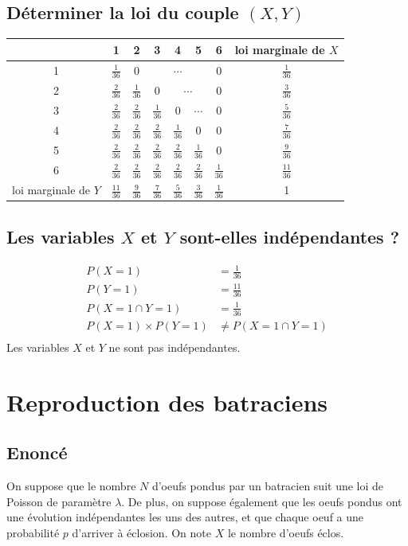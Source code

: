 \documentclass[10pt,a4paper,twoside]{article}
\begin{document}
\subsection{Déterminer la loi du couple $(X,Y)$}

\renewcommand\arraystretch{1.75}
\begin{tabular}{|c|cccccc|c|}
\hline 
 & 1 & 2 & 3 & 4 & 5 & 6 & loi marginale de $X$ \\ 
\hline 
1 & $\frac{1}{36}$ & 0 & \multicolumn{3}{c}{$\cdots$} & 0 & $\frac{1}{36}$ \\ 
2 & $\frac{2}{36}$ & $\frac{1}{36}$ & 0 & \multicolumn{2}{c}{$\cdots$} & 0 & $\frac{3}{36}$\\
3 & $\frac{2}{36}$ & $\frac{2}{36}$ & $\frac{1}{36}$ & 0 & $\cdots$ & 0 & $\frac{5}{36}$\\
4 & $\frac{2}{36}$ & $\frac{2}{36}$ & $\frac{2}{36}$ & $\frac{1}{36}$ & 0 & 0 & $\frac{7}{36}$\\
5 & $\frac{2}{36}$ & $\frac{2}{36}$ & $\frac{2}{36}$ & $\frac{2}{36}$ & $\frac{1}{36}$ & 0 & $\frac{9}{36}$\\
6 & $\frac{2}{36}$ & $\frac{2}{36}$ & $\frac{2}{36}$ & $\frac{2}{36}$ & $\frac{2}{36}$ & $\frac{1}{36}$ & $\frac{11}{36}$\\
\hline
loi marginale de $Y$ & $\frac{11}{36}$ & $\frac{9}{36}$ & $\frac{7}{36}$ & $\frac{5}{36}$ & $\frac{3}{36}$ & $\frac{1}{36}$ & 1\\
\hline
\end{tabular} 
\renewcommand\arraystretch{1}

\subsection{Les variables $X$ et $Y$ sont-elles indépendantes ?}
\begin{align*}
P(X=1) &= \frac{1}{36}\\
P(Y=1) &= \frac{11}{36}\\
P(X=1\cap Y=1) &= \frac{1}{36}\\
P(X=1)\times P(Y=1) &\neq P(X=1\cap Y=1)\\
\end{align*}
Les variables $X$ et $Y$ ne sont pas indépendantes.

\section{Reproduction des batraciens}
\subsection*{Enoncé}
On suppose que le nombre $N$ d'oeufs pondus par un batracien suit une loi de Poisson de paramètre $\lambda$. De plus, on suppose également que les oeufs pondus ont une évolution indépendantes les uns des autres, et que chaque oeuf a une probabilité $p$ d'arriver à éclosion. On note $X$ le nombre d'oeufs éclos.
\end{document}
